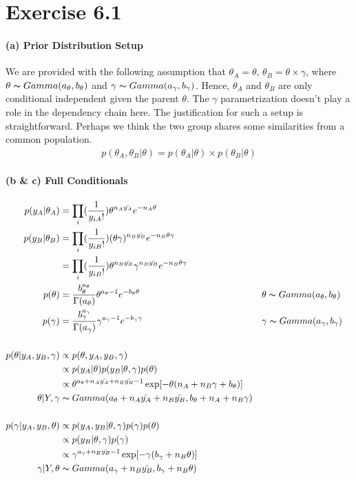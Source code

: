 \documentclass[11pt, letterpaper]{article}
\begin{document}
\section{Exercise 6.1}
\paragraph{(a) Prior Distribution Setup}
We are provided with the following assumption that $\theta_A = \theta$, $\theta_B = \theta \times \gamma$, where $\theta \thicksim Gamma(a_\theta, b_\theta)$ and $\gamma \thicksim Gamma(a_\gamma, b_\gamma)$. Hence, $\theta_A$ and $\theta_B$ are only conditional independent given the parent $\theta$. The $\gamma$ parametrization doesn't play a role in the dependency chain here. The justification for such a setup is straightforward. Perhaps we think the two group shares some similarities from a common population.
\begin{align*}
    p(\theta_A, \theta_B|\theta) = p(\theta_A|\theta) \times p(\theta_B|\theta)
\end{align*}

\paragraph{(b \& c) Full Conditionals}
\begin{align*}
    p(y_A|\theta_A) &= \prod_i(\frac{1}{y_{iA}!}) \theta^{n_A\bar{y_A}} e^{-n_A\theta} \\
    p(y_B|\theta_B) &= \prod_i(\frac{1}{y_{iB}!}) (\theta\gamma)^{n_B\bar{y_B}} e^{-n_B\theta\gamma} \\
        &= \prod_i(\frac{1}{y_{iB}!}) \theta^{n_B\bar{y_B}} \gamma^{n_B\bar{y_B}} e^{-n_B\theta\gamma} \\
    p(\theta) &= \frac{b_{\theta}^{a_\theta}}{\Gamma(a_{\theta})} \theta^{a_\theta-1} e^{-b_\theta \theta}
        && \theta \thicksim Gamma(a_\theta, b_\theta) \\
    p(\gamma) &= \frac{b_{\gamma}^{a_\gamma}}{\Gamma(a_{\gamma})} \gamma^{a_\gamma-1} e^{-b_\gamma \gamma}
        && \gamma \thicksim Gamma(a_\gamma, b_\gamma) \\ \\
    p(\theta|y_A, y_B, \gamma) &\propto p(\theta, y_A, y_B, \gamma) \\
        &\propto p(y_A|\theta) p(y_B|\theta, \gamma) p(\theta) \\
        &\propto \theta^{a_\theta + n_A\bar{y_A} + n_B\bar{y_B} - 1} \exp[-\theta(n_A+n_B\gamma+b_\theta)] \\
    \theta|Y, \gamma &\thicksim Gamma(a_\theta + n_A\bar{y_A} + n_B\bar{y_B}, b_\theta+n_A+n_B\gamma) \\ \\
    p(\gamma|y_A, y_B, \theta) &\propto p(y_A, y_B|\theta, \gamma) p(\gamma) p(\theta) \\
        &\propto p(y_B|\theta, \gamma) p(\gamma) \\
        &\propto \gamma^{a_\gamma + n_B\bar{y_B}-1} \exp[-\gamma(b_\gamma + n_B\theta)] \\
    \gamma|Y, \theta &\thicksim Gamma(a_\gamma + n_B\bar{y_B}, b_\gamma + n_B\theta)
\end{align*}
\end{document}
